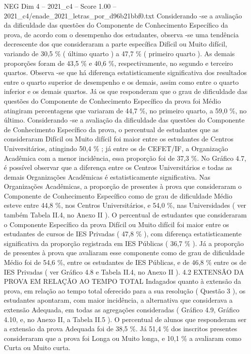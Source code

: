 \begin{textsample}{NEG Dim 4 – 2021\_c4 – Score 1.00 – 2021\_c4/enade\_2021\_letras\_por\_d96b21bbf0.txt}
Considerando -se a avaliação da dificuldade das questões do Componente de Conhecimento Específico da prova, de acordo com o desempenho dos estudantes, observa -se uma tendência decrescente dos que consideraram a parte específica Difícil ou Muito difícil, variando de 30,5 \% ( último quarto ) a 47,7 \% ( primeiro quarto ).
As demais proporções foram de 43,5 \% e 40,6 \%, respectivamente, no segundo e terceiro quartos.
Observa -se que há diferença estatisticamente significativa dos resultados entre o quarto superior de desempenho e os demais, assim como entre o quarto inferior e os demais quartos.
Já os que responderam que o grau de dificuldade das questões do Componente de Conhecimento Específico da prova foi Médio atingiram percentagens que variaram de 44,7 \%, no primeiro quarto, a 59,0 \%, no último.
Considerando -se a avaliação da dificuldade das questões do Componente de Conhecimento Específico da prova, o percentual de estudantes que as consideraram Difícil ou Muito difícil foi maior entre os estudantes de Centros Universitários, atingindo 50,4 \% ; já entre os de CEFET/IF, a Organização Acadêmica com a menor incidência, essa proporção foi de 37,3 \%.
No Gráfico 4.7, é possível observar que a diferença entre os Centros Universitários e todas as demais Organizações Acadêmicas é estatisticamente significativa.
Nas Organizações Acadêmicas, a proporção de presentes à prova que consideraram o Componente de Conhecimento Específico como de grau de dificuldade Médio esteve entre 44,8 \%, nos Centros Universitários, e 54,0 \%, nas Universidades ( ver também Tabela II.4, no Anexo II ).
O percentual de estudantes que consideraram o Componente Específico da prova Difícil ou Muito difícil foi maior entre os estudantes de cursos de IES Privadas ( 47,8 \% ), com diferença estatisticamente significativa da proporção registrada em IES Públicas ( 36,7 \% ).
Já a proporção de presentes à prova que avaliaram esse componente como de grau de dificuldade Médio foi de 54,6 \%, entre os estudantes de IES Públicas, e de 46,8 \% entre os de IES Privadas ( ver Gráfico 4.8 e Tabela II.4, no Anexo II ). 4.2 EXTENSÃO DA PROVA EM RELAÇÃO AO TEMPO TOTAL Indagados quanto à extensão da prova, em relação ao tempo total oferecido para a sua resolução ( Questão 3 ), os estudantes apontaram, com maior incidência, a alternativa que considerava a extensão Adequada, em todas as agregações consideradas ( Gráfico 4.9, Gráfico 4.10, e, no Anexo II, a Tabela II.5 ).
O percentual de alunos que responderam ser a extensão da prova Adequada foi de 38,5 \%.
Já 51,4 \% dos inscritos presentes consideraram que a prova foi Longa ou Muito longa, e 10,1 \% a avaliaram como Curta ou Muito curta.

\end{textsample}
